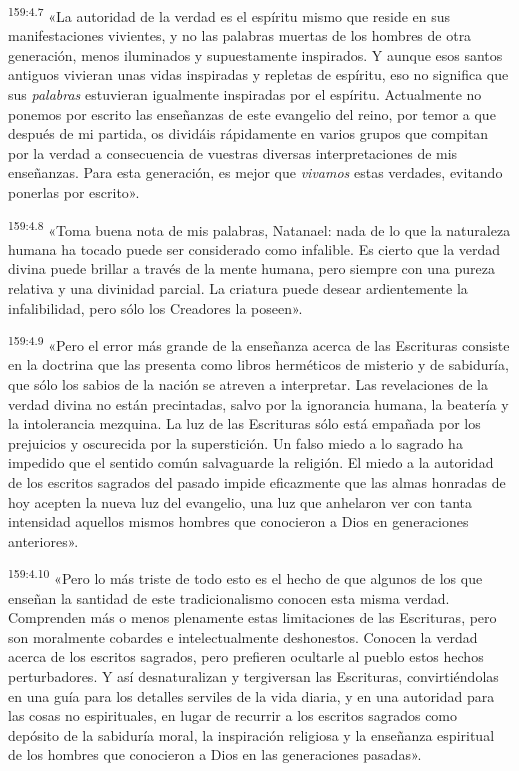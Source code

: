 \par 
\textsuperscript{159:4.7} «La autoridad de la verdad es el espíritu mismo que reside en sus manifestaciones vivientes, y no las palabras muertas de los hombres de otra generación, menos iluminados y supuestamente inspirados. Y aunque esos santos antiguos vivieran unas vidas inspiradas y repletas de espíritu, eso no significa que sus \textit{palabras} estuvieran igualmente inspiradas por el espíritu. Actualmente no ponemos por escrito las enseñanzas de este evangelio del reino, por temor a que después de mi partida, os dividáis rápidamente en varios grupos que compitan por la verdad a consecuencia de vuestras diversas interpretaciones de mis enseñanzas. Para esta generación, es mejor que \textit{vivamos} estas verdades, evitando ponerlas por escrito».

\par 
\textsuperscript{159:4.8} «Toma buena nota de mis palabras, Natanael: nada de lo que la naturaleza humana ha tocado puede ser considerado como infalible. Es cierto que la verdad divina puede brillar a través de la mente humana, pero siempre con una pureza relativa y una divinidad parcial. La criatura puede desear ardientemente la infalibilidad, pero sólo los Creadores la poseen».

\par 
\textsuperscript{159:4.9} «Pero el error más grande de la enseñanza acerca de las Escrituras consiste en la doctrina que las presenta como libros herméticos de misterio y de sabiduría, que sólo los sabios de la nación se atreven a interpretar. Las revelaciones de la verdad divina no están precintadas, salvo por la ignorancia humana, la beatería y la intolerancia mezquina. La luz de las Escrituras sólo está empañada por los prejuicios y oscurecida por la superstición. Un falso miedo a lo sagrado ha impedido que el sentido común salvaguarde la religión. El miedo a la autoridad de los escritos sagrados del pasado impide eficazmente que las almas honradas de hoy acepten la nueva luz del evangelio, una luz que anhelaron ver con tanta intensidad aquellos mismos hombres que conocieron a Dios en generaciones anteriores».

\par 
\textsuperscript{159:4.10} «Pero lo más triste de todo esto es el hecho de que algunos de los que enseñan la santidad de este tradicionalismo conocen esta misma verdad. Comprenden más o menos plenamente estas limitaciones de las Escrituras, pero son moralmente cobardes e intelectualmente deshonestos. Conocen la verdad acerca de los escritos sagrados, pero prefieren ocultarle al pueblo estos hechos perturbadores. Y así desnaturalizan y tergiversan las Escrituras, convirtiéndolas en una guía para los detalles serviles de la vida diaria, y en una autoridad para las cosas no espirituales, en lugar de recurrir a los escritos sagrados como depósito de la sabiduría moral, la inspiración religiosa y la enseñanza espiritual de los hombres que conocieron a Dios en las generaciones pasadas».

